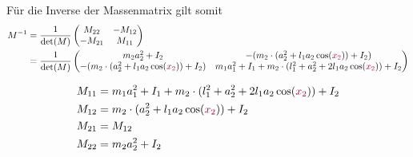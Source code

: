 \documentclass[a4paper, 12pt]{scrartcl}
\newcommand{\dunkelrot}[2][dunkelrot]{\textcolor{#1}{#2}}
\begin{document}
Für die Inverse der Massenmatrix gilt somit
\begin{align*}
    M^{-1} &= \frac{1}{\det(M)} 
    \begin{pmatrix}
        M_{22} & -M_{12} \\
        -M_{21} & M_{11}
    \end{pmatrix} \\
    &= \frac{1}{\det(M)} 
    \begin{pmatrix}
        m_2 a_2^2 + I_2 & - (m_2 \cdot (a_2^2 +  l_1 a_2  \cos(\dunkelrot{x_{2}})) + I_2) \\
        - (m_2 \cdot (a_2^2 +  l_1 a_2  \cos(\dunkelrot{x_{2}})) + I_2) & m_1 a_1^2 + I_1 + m_2 \cdot (l_1^2 +a_2^2 + 2 l_1 a_2  \cos(\dunkelrot{x_{2}}) ) + I_2 
    \end{pmatrix}
\end{align*}

\begin{align*}
    M_{11} &= m_1 a_1^2 + I_1 + m_2 \cdot (l_1^2 +a_2^2 + 2 l_1 a_2  \cos(\dunkelrot{x_{2}}) ) + I_2 \\
    M_{12} &= m_2 \cdot (a_2^2 +  l_1 a_2  \cos(\dunkelrot{x_{2}})) + I_2 \\
    M_{21} &= M_{12} \\
    M_{22} &= m_2 a_2^2 + I_2
\end{align*}
\end{document}
